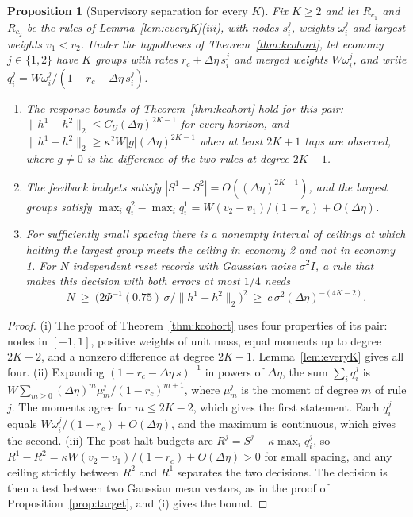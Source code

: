 \documentclass[12pt]{article}
\newtheorem{proposition}[theorem]{Proposition}
\theoremstyle{definition}
\theoremstyle{remark}
\begin{document}
\begin{proposition}[Supervisory separation for every $K$]\label{prop:targetK}
Fix $K\ge2$ and let $R_{c_1}$ and $R_{c_2}$ be the rules of Lemma~\ref{lem:everyK}(iii), with nodes $s^j_i$, weights $\omega^j_i$ and largest weights $v_1<v_2$. Under the hypotheses of Theorem~\ref{thm:kcohort}, let economy $j\in\{1,2\}$ have $K$ groups with rates $r_c+\Delta\eta\,s^j_i$ and merged weights $W\omega^j_i$, and write $q^j_i=W\omega^j_i/(1-r_c-\Delta\eta\,s^j_i)$.
\begin{enumerate}[label=(\roman*),itemsep=1pt]
\item The response bounds of Theorem~\ref{thm:kcohort} hold for this pair: $\|h^1-h^2\|_2\le C_U(\Delta\eta)^{2K-1}$ for every horizon, and $\|h^1-h^2\|_2\ge\kappa^2W|g|(\Delta\eta)^{2K-1}$ when at least $2K+1$ taps are observed, where $g\ne0$ is the difference of the two rules at degree $2K-1$.
\item The feedback budgets satisfy $|S^1-S^2|=O((\Delta\eta)^{2K-1})$, and the largest groups satisfy $\max_iq^2_i-\max_iq^1_i=W(v_2-v_1)/(1-r_c)+O(\Delta\eta)$.
\item For sufficiently small spacing there is a nonempty interval of ceilings at which halting the largest group meets the ceiling in economy 2 and not in economy 1. For $N$ independent reset records with Gaussian noise $\sigma^2I$, a rule that makes this decision with both errors at most $1/4$ needs
\[
N\ \ge\ \bigl(2\Phi^{-1}(0.75)\,\sigma/\|h^1-h^2\|_2\bigr)^2\ \ge\ c\,\sigma^2(\Delta\eta)^{-(4K-2)} .
\]
\end{enumerate}
\end{proposition}

\begin{proof}
(i) The proof of Theorem~\ref{thm:kcohort} uses four properties of its pair: nodes in $[-1,1]$, positive weights of unit mass, equal moments up to degree $2K-2$, and a nonzero difference at degree $2K-1$. Lemma~\ref{lem:everyK} gives all four. (ii) Expanding $(1-r_c-\Delta\eta\,s)^{-1}$ in powers of $\Delta\eta$, the sum $\sum_iq^j_i$ is $W\sum_{m\ge0}(\Delta\eta)^m\mu^j_m/(1-r_c)^{m+1}$, where $\mu^j_m$ is the moment of degree $m$ of rule $j$. The moments agree for $m\le2K-2$, which gives the first statement. Each $q^j_i$ equals $W\omega^j_i/(1-r_c)+O(\Delta\eta)$, and the maximum is continuous, which gives the second. (iii) The post-halt budgets are $R^j=S^j-\kappa\max_iq^j_i$, so $R^1-R^2=\kappa W(v_2-v_1)/(1-r_c)+O(\Delta\eta)>0$ for small spacing, and any ceiling strictly between $R^2$ and $R^1$ separates the two decisions. The decision is then a test between two Gaussian mean vectors, as in the proof of Proposition~\ref{prop:target}, and (i) gives the bound.
\end{proof}
\end{document}

